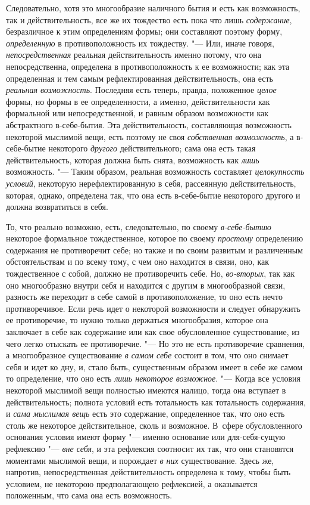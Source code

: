 Следовательно, хотя это многообразие наличного бытия и есть как возможность,
так и действительность, все же их тождество есть пока что лишь
{\em содержание}, безразличное к этим определениям
формы; они составляют поэтому форму, {\em определенную}
в противоположность их тождеству. "--- Или, иначе говоря,
{\em непосредственная} реальная действительность именно
потому, что она непосредственна, определена в противоположность к ее
возможности; как эта определенная и тем самым рефлектированная
действительность, она есть {\em реальная возможность}.
Последняя есть теперь, правда, положенное {\em целое}
формы, но формы в ее определенности, а именно, действительности как
формальной или непосредственной, и равным образом возможности как
абстрактного в-себе-бытия. Эта действительность, составляющая возможность
некоторой мыслимой вещи, есть поэтому не своя
{\em собственная возможность}, а в-себе-бытие
некоторого {\em другого} действительного; сама она есть
такая действительность, которая должна быть снята, возможность как
{\em лишь} возможность. "--- Таким образом, реальная
возможность составляет {\em целокупность условий},
некоторую нерефлектированную в себя, рассеянную действительность, которая,
однако, определена так, что она есть в-себе-бытие некоторого другого и
должна возвратиться в себя.

То, что реально возможно, есть, следовательно, по своему
{\em в-себе-бытию} некоторое формальное тождественное,
которое по своему {\em простому} определению содержания
не противоречит себе; но также и по своим развитым и различенным
обстоятельствам и по всему тому, с чем оно находится в связи, оно, как
тождественное с собой, должно не противоречить себе. Но,
{\em во-вторых}, так как оно многообразно внутри себя и
находится с другим в многообразной связи, разность же переходит в себе
самой в противоположение, то оно есть нечто противоречивое. Если речь идет
о некоторой возможности и следует обнаружить ее противоречие, то нужно
только держаться многообразия, которое она заключает в себе как содержание
или как свое обусловленное существование, из чего легко отыскать ее
противоречие. "--- Но это не есть противоречие сравнения, а многообразное
существование {\em в самом себе} состоит в том, что оно
снимает себя и идет ко дну, и, стало быть, существенным образом имеет в
себе же самом то определение, что оно есть {\em лишь
некоторое возможное}. "--- Когда все условия некоторой мыслимой вещи полностью
имеются налицо, тогда она вступает в действительность; полнота условий есть
тотальность как тотальность содержания, и {\em сама
мыслимая вещь} есть это содержание, определенное так, что оно есть столь же
некоторое действительное, сколь и возможное. В~сфере обусловленного
основания условия имеют форму "--- именно основание или для-себя-сущую
рефлексию "--- {\em вне себя}, и эта рефлексия соотносит
их так, что они становятся моментами мыслимой вещи, и порождает
{\em в них} существование. Здесь же, напротив,
непосредственная действительность определена к тому, чтобы быть условием,
не некоторою предполагающею рефлексией, а оказывается положенным, что сама
она есть возможность.

